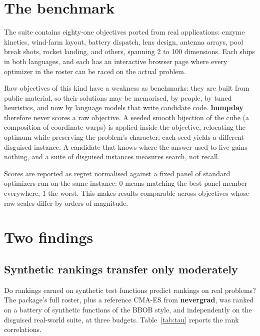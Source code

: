 \documentclass[article]{jss}
\providecommand{\pkg}[1]{\textbf{#1}}
\begin{document}
\section{The benchmark} \label{sec:benchmark}

The suite contains eighty-one objectives ported from real applications:
enzyme kinetics, wind-farm layout, battery dispatch, lens design, antenna
arrays, pool break shots, rocket landing, and others, spanning 2 to 100
dimensions. Each ships in both languages, and each has an interactive
browser page where every optimizer in the roster can be raced on the actual
problem.

Raw objectives of this kind have a weakness as benchmarks: they are built
from public material, so their solutions may be memorised, by people, by
tuned heuristics, and now by language models that write candidate code.
\pkg{humpday} therefore never scores a raw objective. A seeded smooth
bijection of the cube (a composition of coordinate warps) is applied inside
the objective, relocating the optimum while preserving the problem's
character; each seed yields a different disguised instance. A candidate
that knows where the answer used to live gains nothing, and a suite of
disguised instances measures search, not recall.

Scores are reported as regret normalised against a fixed panel of standard
optimizers run on the same instance: 0 means matching the best panel member
everywhere, 1 the worst. This makes results comparable across objectives
whose raw scales differ by orders of magnitude.

\section{Two findings} \label{sec:findings}

\subsection{Synthetic rankings transfer only moderately}

Do rankings earned on synthetic test functions predict rankings on real
problems? The package's full roster, plus a reference CMA-ES from
\pkg{nevergrad}, was ranked on a battery of synthetic functions of the
BBOB style, and independently on the disguised real-world suite, at three
budgets. Table~\ref{tab:tau} reports the rank correlations.
\end{document}
